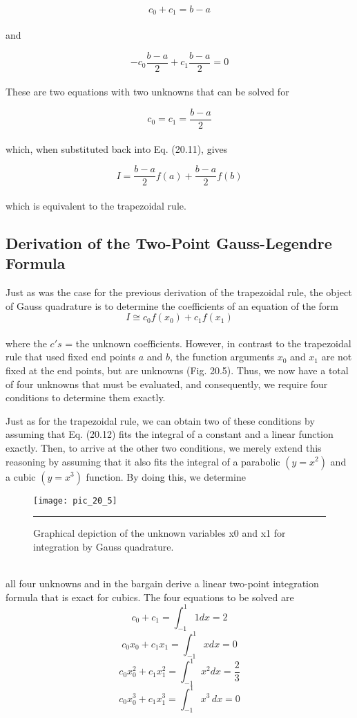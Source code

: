 \documentclass[../main.tex]{subfiles}
\begin{document}
	$$c_0 + c_1 = b-a$$\\
and

	$$-c_0 \dfrac{b-a}{2} + c_1 \dfrac{b-a}{2} = 0$$\\
These are two equations with two unknowns that can be solved for

	$$c_0= c_1 = \dfrac{b-a}{2}$$\\
which, when substituted back into Eq. (20.11), gives

	$$I= \dfrac{b-a}{2} f(a) + \dfrac{b-a}{2} f(b)$$\\
which is equivalent to the trapezoidal rule.

\subsection{Derivation of the Two-Point Gauss-Legendre Formula}
Just as was the case for the previous derivation of the trapezoidal rule, the object of Gauss
quadrature is to determine the coefficients of an equation of the form
\vspace{0.4in}
\begin{equation}
	\tag{20.12}
	I\cong c_0 f(x_0)+c_1 f(x_1)
\end{equation}\\
where the $c's$ = the unknown coefficients. However, in contrast to the trapezoidal rule that
used fixed end points $a$ and $b$, the function arguments $x_0$ and $x_1$ are not fixed at the end
points, but are unknowns (Fig. 20.5). Thus, we now have a total of four unknowns that
must be evaluated, and consequently, we require four conditions to determine them exactly.

Just as for the trapezoidal rule, we can obtain two of these conditions by assuming
that Eq. (20.12) fits the integral of a constant and a linear function exactly. Then, to arrive at
the other two conditions, we merely extend this reasoning by assuming that it also fits the
integral of a parabolic $(y = x^2)$ and a cubic $(y = x^3)$ function. By doing this, we determine
\pagebreak
\begin{figure}[hbt!]
	\centering
	\texttt{[image: pic\_20\_5]}
	\caption{\textsf{Graphical depiction of the unknown variables x0 and x1 for integration by Gauss quadrature.}} \hrule
	\label{pic.20.5}
\end{figure}\\
all four unknowns and in the bargain derive a linear two-point integration formula that is
exact for cubics. The four equations to be solved are
\begin{equation}
	\tag{20.13}
	c_0+c_1 = \int^{1}_{-1} 1dx = 2
\end{equation}
\begin{equation}
	\tag{20.14}
	c_0 x_0 + c_1 x_1 = \int^{1}_{-1} xdx = 0
\end{equation}
\begin{equation}
	\tag{20.15}
	c_0 x^{2}_{0} + c_1 x^{2}_{1} = \int^{1}_{-1} x^2 dx = \dfrac{2}{3}
\end{equation}
\begin{equation}
	\tag{20.16}
	c_0 x^{3}_{0} + c_1 x^{3}_{1} = \int^{1}_{-1} x^3 \, dx = 0
\end{equation}
\end{document}
